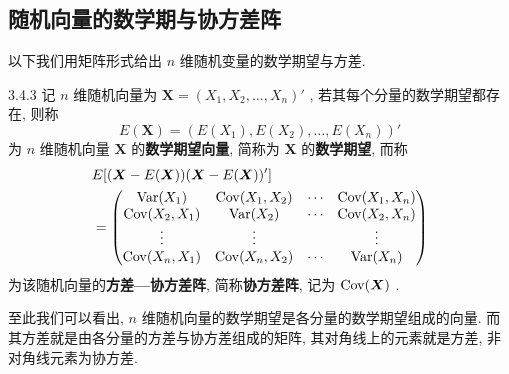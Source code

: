 	\subsection{随机向量的数学期与协方差阵}\label{ssec:3.4.5}
	以下我们用矩阵形式给出 $n$ 维随机变量的数学期望与方差.
	\begin{definition}{}{3.4.3}
		记 $n$ 维随机向量为 $\boldsymbol{X}=(X_1,X_2,\ldots,X_n)'$ , 若其每个分量的数学期望都存在, 则称
		\begin{equation*}
			E(\boldsymbol{X})=(E(X_1),E(X_2),\ldots,E(X_n))'
		\end{equation*}
		为 $n$ 维随机向量 $\boldsymbol{X}$ 的\textbf{数学期望向量}, 简称为 $\boldsymbol{X}$ 的\textbf{数学期望}, 而称
		\begin{align*}
			&E[ (\boldsymbol{X}-E(\boldsymbol{X})) (\boldsymbol{X}-E(\boldsymbol{X}))' ]\\
			&=\begin{pmatrix}
				\operatorname{Var}(X_1) & \operatorname{Cov}(X_1,X_2) & \cdots & \operatorname{Cov}(X_1,X_n)\\
				\operatorname{Cov}(X_2,X_1) & \operatorname{Var}(X_2) & \cdots & \operatorname{Cov}(X_2,X_n)\\
				\vdots & \vdots & &\vdots\\
				\operatorname{Cov}(X_n,X_1) & \operatorname{Cov}(X_n,X_2) & \cdots & \operatorname{Var}(X_n)
			\end{pmatrix}
		\end{align*}
		为该随机向量的\textbf{方差—协方差阵}, 简称\textbf{协方差阵}, 记为 $\operatorname{Cov}(\boldsymbol{X})$ .
	\end{definition}
	至此我们可以看出, $n$ 维随机向量的数学期望是各分量的数学期望组成的向量. 而其方差就是由各分量的方差与协方差组成的矩阵, 其对角线上的元素就是方差, 非对角线元素为协方差.

